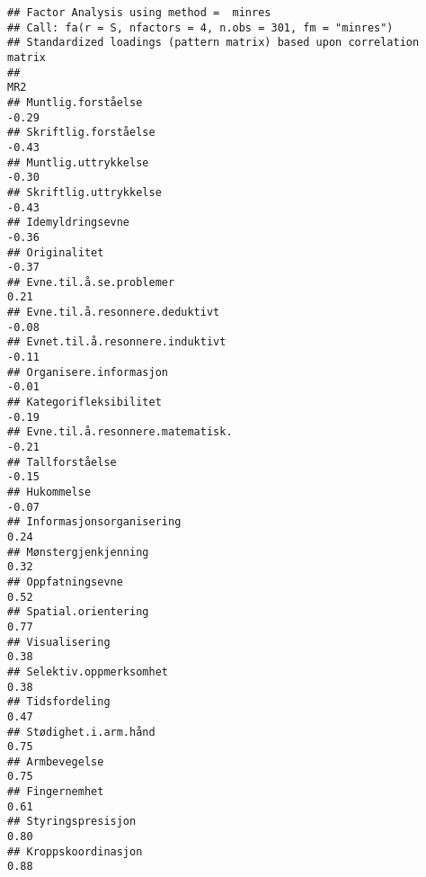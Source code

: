\documentclass[
]{article}
\begin{document}
\begin{verbatim}
## Factor Analysis using method =  minres
## Call: fa(r = S, nfactors = 4, n.obs = 301, fm = "minres")
## Standardized loadings (pattern matrix) based upon correlation matrix
##                                                                                    MR2
## Muntlig.forståelse                                                               -0.29
## Skriftlig.forståelse                                                             -0.43
## Muntlig.uttrykkelse                                                              -0.30
## Skriftlig.uttrykkelse                                                            -0.43
## Idemyldringsevne                                                                 -0.36
## Originalitet                                                                     -0.37
## Evne.til.å.se.problemer                                                           0.21
## Evne.til.å.resonnere.deduktivt                                                   -0.08
## Evnet.til.å.resonnere.induktivt                                                  -0.11
## Organisere.informasjon                                                           -0.01
## Kategorifleksibilitet                                                            -0.19
## Evne.til.å.resonnere.matematisk.                                                 -0.21
## Tallforståelse                                                                   -0.15
## Hukommelse                                                                       -0.07
## Informasjonsorganisering                                                          0.24
## Mønstergjenkjenning                                                               0.32
## Oppfatningsevne                                                                   0.52
## Spatial.orientering                                                               0.77
## Visualisering                                                                     0.38
## Selektiv.oppmerksomhet                                                            0.38
## Tidsfordeling                                                                     0.47
## Stødighet.i.arm.hånd                                                              0.75
## Armbevegelse                                                                      0.75
## Fingernemhet                                                                      0.61
## Styringspresisjon                                                                 0.80
## Kroppskoordinasjon                                                                0.88

\end{verbatim}
\end{document}
